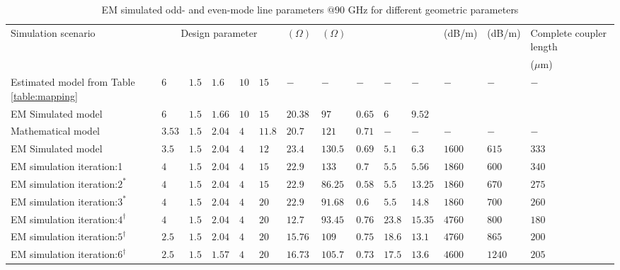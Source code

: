 \documentclass[journal]{IEEEtran}
\begin{document}
\begin{table*}
\caption{EM simulated odd- and even-mode line parameters $@90$ GHz for different geometric
parameters}
\label{table:simulation} %
\begin{tabular}{ |p{3.4cm}||p{.37cm}|p{.37cm}|p{.37cm}|p{.37cm}|p{.37cm}|p{.6cm}|p{.6cm}|p{.37cm}|p{.37cm}|p{.6cm}|p{.65cm}|p{.65cm}|p{1.7cm}| }
 \hline
 \multirow{2}{*}{Simulation scenario} & \multicolumn{5}{|c|}{Design parameter} & \multirow{2}{*}{$(\Omega)$} & \multirow{2}{*}{$(\Omega)$} & & & & \multirow{2}{*}{(dB/m)} & \multirow{2}{*}{(dB/m)} & Complete coupler length  \\  \cline{2-6}
  &  &  &  &  &  &  &  &  &  &  &  &  & ($\mu$m)\\ %
 \hline
  Estimated model from Table \ref{table:mapping} & $6$ & $1.5$  & $1.6$ & $10$ & $15$ & $-$ & $-$ & $-$ & $-$ & $-$ & $-$ & $-$ & $-$\\
 \hline
  EM Simulated model & $6$ & $1.5$  & $1.66$ & $10$ & $15$ & $20.38$ & $97$ & $0.65$ & $6$ & $9.52$ & & & \\
 \hline
  Mathematical model & $3.53$ & $1.5$  & $2.04$ & $4$ & $11.8$ & $20.7$ & $121$ & $0.71$ & $-$ & $-$ & $-$ & $-$ & $-$ \\
 \hline
  EM Simulated model & $3.5$ & $1.5$  & $2.04$ & $4$ & $12$ & $23.4$ & $130.5$ & $0.69$ & $5.1$ & $6.3$ & $1600$ & $615$ & $333$\\
 \hline
  EM simulation iteration:1 & $4$ & $1.5$  & $2.04$ & $4$ & $15$ & $22.9$ & $133$ & $0.7$ & $5.5$ & $5.56$ & $1860$ & $600$ & $340$\\
 \hline
  EM simulation iteration:$2^*$ & $4$ & $1.5$  & $2.04$ & $4$ & $15$ & $22.9$ & $86.25$ & $0.58$ & $5.5$ & $13.25$ & $1860$ & $670$ & $275$\\
 \hline
   EM simulation iteration:$3^*$ & $4$ & $1.5$  & $2.04$ & $4$ & $20$ & $22.9$ & $91.68$ & $0.6$ & $5.5$ & $14.8$ & $1860$ & $700$ & $260$\\ 
 \hline
   EM simulation iteration:$4^\dagger$ &  $4$ & $1.5$  & $2.04$ & $4$ & $20$ & $12.7$ & $93.45$ & $0.76$ & $23.8$ & $15.35$ & $4760$ & $800$ & $180$\\
 \hline
   EM simulation iteration:$5^\dagger$ &  $2.5$ & $1.5$  & $2.04$ & $4$ & $20$ & $15.76$ & $109$ & $0.75$ & $18.6$ & $13.1$ & $4760$ & $865$ & $200$\\
 \hline
   EM simulation iteration:$6^\dagger$ &  $2.5$ & $1.5$  & $1.57$ & $4$ & $20$ & $16.73$ & $105.7$ & $0.73$ & $17.5$ & $13.6$ & $4600$ & $1240$ & $205$\\
 \hline
\end{tabular}
\end{table*}
\end{document}
